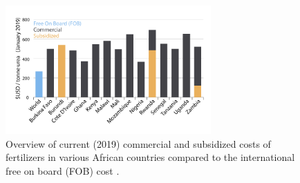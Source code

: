 \begin{figure}
    \centering
    \includegraphics[width=0.7\textwidth]{Figures/africa_prices.pdf}
    \caption{Overview of current (2019) commercial and subsidized costs of fertilizers in various African countries compared to the international free on board (FOB) cost \cite{africafertilizer_2018}.}
    \label{fig:africa_costs}
\end{figure}

